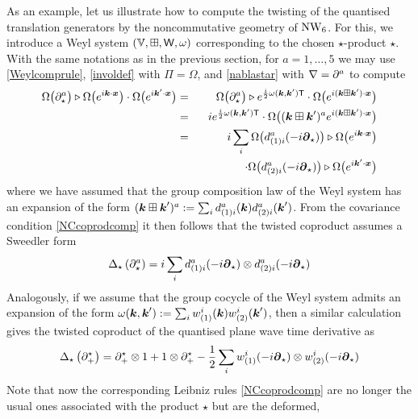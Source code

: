 As an example, let us illustrate how to compute the twisting of the quantised
translation generators by the noncommutative geometry of $\operatorname{NW}_6$. For this, we
introduce a Weyl system $({\mathbb V},\boxplus,\operatorname{{\sf W}},\omega)$ corresponding to the chosen
$\star$-product $\star$. With the same notations as in the previous section, for
$a=1,\dots,5$ we may use \eqref{Weylcomprule}, \eqref{involdef} with
$\Pi=\Omega$, and \eqref{nablastar} with $\nabla=\partial^a$ to compute
\begin{eqnarray}
  \label{partialstarderiv}
  \Omega\bigl(\partial_\star^a\bigr)\triangleright\Omega\bigl(
 e^{ i{{\boldsymbol {k} }}\cdot{{\boldsymbol {x} }}}\bigr)\cdot\Omega\bigl( e^{ i{{\boldsymbol {k} }}'\cdot{{\boldsymbol {x} }}}
\bigr)&=&\Omega\bigl(\partial_\star^a\bigr)\triangleright
 e^{\frac i2 \omega({{\boldsymbol {k} }},{{\boldsymbol {k} }}' ) {\sf T}} \cdot \Omega\bigl(
 e^{ i({{\boldsymbol {k} }}\boxplus{{\boldsymbol {k} }}' )\cdot{{\boldsymbol {x} }}}\bigr) \\\nonumber &=&
 i  e^{\frac i2 \omega({{\boldsymbol {k} }},{{\boldsymbol {k} }}' ) {\sf T}} \cdot \Omega
\bigl(({{\boldsymbol {k} }}\boxplus{{\boldsymbol {k} }}' )^a  e^{ i({{\boldsymbol {k} }}\boxplus{{\boldsymbol {k} }}' )\cdot{{\boldsymbol {x} }}}\bigr)
\\\nonumber &=&  i  \sum\limits_i  \Omega\bigl(d^a_{(1) i}(
- i{{\boldsymbol {\partial} }}_\star)\bigr)\triangleright\Omega\bigl( e^{ i{{\boldsymbol {k} }}\cdot{{\boldsymbol {x} }}}
\bigr)\\\nonumber && \qquad\qquad
\cdot \Omega\bigl(d^a_{(2) i}(- i{{\boldsymbol {\partial} }}_\star)\bigr)
\triangleright\Omega\bigl( e^{ i{{\boldsymbol {k} }}'\cdot{{\boldsymbol {x} }}}\bigr)
\end{eqnarray}
where we have assumed that the group composition law of the Weyl system has an
expansion of the form $({{\boldsymbol {k} }}\boxplus{{\boldsymbol {k} }}' )^a := \sum_i d^a_{(1) i}({{\boldsymbol {k} }}) d^a_{(2)
  i}({{\boldsymbol {k} }}' )$. From the covariance condition \eqref{NCcoprodcomp} it then follows
that the twisted coproduct assumes a Sweedler form
\begin{equation}
  \label{Deltastarexpl}
  \Delta_\star\left(\partial_\star^a\right)= i 
  \sum\limits_i  d^a_{(1) i}(- i{{\boldsymbol {\partial} }}_\star)\otimes
  d^a_{(2) i}(- i{{\boldsymbol {\partial} }}_\star)
\end{equation}
Analogously, if we assume that the group cocycle of the Weyl system admits an
expansion of the form $\omega({{\boldsymbol {k} }},{{\boldsymbol {k} }}' ) := \sum_i w^i_{(1)}({{\boldsymbol {k} }}) w^i_{(2)}({{\boldsymbol {k} }}'
)$, then a similar calculation gives the twisted coproduct of the quantised
plane wave time derivative as
\begin{equation}
  \label{Deltastartime}
  \Delta_\star\left(\partial_+^\star\right)=\partial_+^\star
  \otimes1+1\otimes\partial_+^\star- \frac12 \sum\limits_i  
  w^i_{(1)}(- i{{\boldsymbol {\partial} }}_\star)\otimes w^i_{(2)}(- i{{\boldsymbol {\partial} }}_\star)
\end{equation}
Note that now the corresponding Leibniz rules \eqref{NCcoprodcomp} are no longer
the usual ones associated with the product $\star$ but are the deformed,
